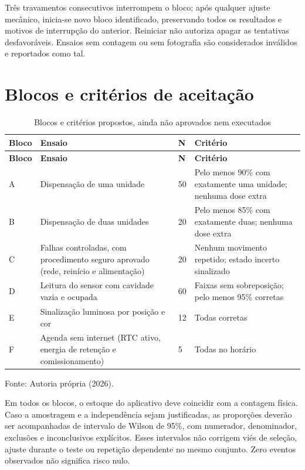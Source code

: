 Três travamentos consecutivos interrompem o bloco; após qualquer ajuste mecânico, inicia-se novo bloco identificado, preservando todos os resultados e motivos de interrupção do anterior. Reiniciar não autoriza apagar as tentativas desfavoráveis. Ensaios sem contagem ou sem fotografia são considerados inválidos e reportados como tal.

\section{Blocos e critérios de aceitação}
{\small\setlength{\tabcolsep}{3pt}\begin{longtable}{p{}p{}p{}p{}}
\caption{Blocos e critérios propostos, ainda não aprovados nem executados}\label{tab:ap-blocos}\\
\hline\textbf{Bloco} & \textbf{Ensaio} & \textbf{N} & \textbf{Critério}\\\hline\endfirsthead
\hline\textbf{Bloco} & \textbf{Ensaio} & \textbf{N} & \textbf{Critério}\\\hline\endhead
A & Dispensação de uma unidade & 50 & Pelo menos 90\% com exatamente uma unidade; nenhuma dose extra\\\hline
B & Dispensação de duas unidades & 20 & Pelo menos 85\% com exatamente duas; nenhuma dose extra\\\hline
C & Falhas controladas, com procedimento seguro aprovado (rede, reinício e alimentação) & 20 & Nenhum movimento repetido; estado incerto sinalizado\\\hline
D & Leitura do sensor com cavidade vazia e ocupada & 60 & Faixas sem sobreposição; pelo menos 95\% corretas\\\hline
E & Sinalização luminosa por posição e cor & 12 & Todas corretas\\\hline
F & Agenda sem internet (RTC ativo, energia de retenção e comissionamento) & 5 & Todas no horário\\\hline
\end{longtable}}{\small\noindent Fonte: Autoria própria (2026).\par}

Em todos os blocos, o estoque do aplicativo deve coincidir com a contagem física. Caso a amostragem e a independência sejam justificadas, as proporções deverão ser acompanhadas de intervalo de Wilson de 95\%, com numerador, denominador, exclusões e inconclusivos explícitos. Esses intervalos não corrigem viés de seleção, ajuste durante o teste ou repetição dependente no mesmo conjunto. Zero eventos observados não significa risco nulo.

